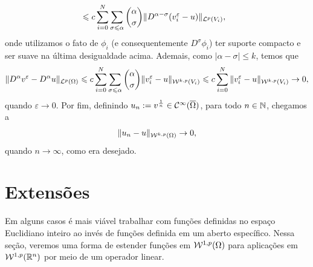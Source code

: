 \begin{prf}
\[\begin{aligned}
            &\leqslant c\sum_{i=0}^N\sum_{\sigma \leqslant \alpha} \binom{\alpha}{\sigma} \Vert D^{\alpha-\sigma}(v^\varepsilon_i - u) \Vert_{\mathcal{L}^p(V_i)},
        \end{aligned}
    \]
    onde utilizamos o fato de $\phi_i$ (e consequentemente $D^\sigma \phi_i$) ter suporte compacto e ser suave na última desigualdade acima. 
    Ademais, como $|\alpha - \sigma| \leqslant k$, temos que
    \[
        \Vert D^\alpha v^\varepsilon - D^\alpha u \Vert_{\mathcal{L}^p(\Omega)} \leqslant c \sum_{i=0}^N\sum_{\sigma \leqslant \alpha} \binom{\alpha}{\sigma} \Vert v_i^\varepsilon - u \Vert_{\mathcal{W}^{k,p}(V_i)} \leqslant c\sum_{i=0}^N \Vert v_i^\varepsilon - u \Vert_{\mathcal{W}^{k,p}(V_i)} \to 0 ,
    \]
    quando $\varepsilon \to 0$.
    Por fim, definindo $u_n := v^{\frac{1}{n}} \in \mathcal{C}^{\infty}(\overline\Omega)$, para todo $n \in \mathbb{N}$, chegamos a 
    \[
        \Vert u_n - u \Vert_{\mathcal{W}^{k,p}(\Omega)} \to 0,
    \]
    quando $n \to \infty$, como era desejado.
\end{prf}

\section{Extensões}

Em alguns casos é mais viável trabalhar com funções definidas no espaço Euclidiano inteiro ao invés de funções definida em um aberto específico.
Nessa seção, veremos uma forma de estender funções em $\mathcal{W}^{1,p}(\Omega)$ para aplicações em $\mathcal{W}^{1,p}(\mathbb{R}^n)$ por meio de um operador linear.

